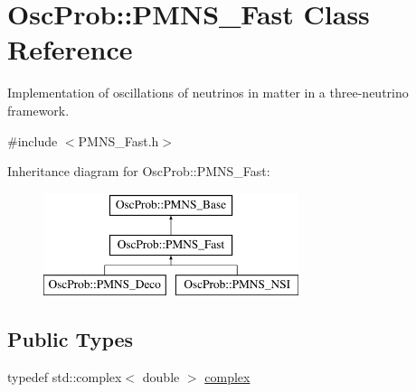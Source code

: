 \hypertarget{classOscProb_1_1PMNS__Fast}{}\section{Osc\+Prob\+:\+:P\+M\+N\+S\+\_\+\+Fast Class Reference}
\label{classOscProb_1_1PMNS__Fast}


Implementation of oscillations of neutrinos in matter in a three-\/neutrino framework.  




{\ttfamily \#include $<$P\+M\+N\+S\+\_\+\+Fast.\+h$>$}

Inheritance diagram for Osc\+Prob\+:\+:P\+M\+N\+S\+\_\+\+Fast\+:\begin{figure}[H]
\begin{center}
\leavevmode
\includegraphics[height=3.000000cm]{classOscProb_1_1PMNS__Fast}
\end{center}
\end{figure}
\subsection*{Public Types}
\begin{DoxyCompactItemize}
\item 
typedef std\+::complex$<$ double $>$ \hyperlink{classOscProb_1_1PMNS__Base_ae86ec4718808ce9d02e5f5b4226714ab}{complex}
\end{DoxyCompactItemize}
